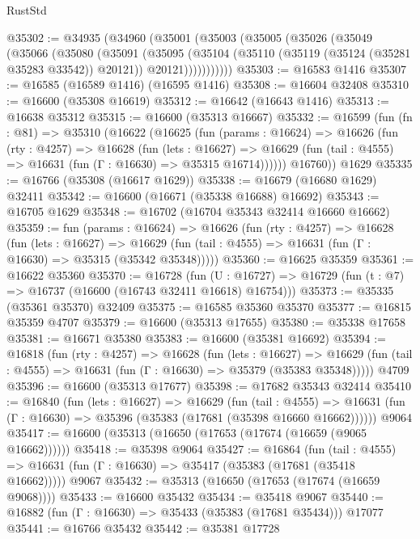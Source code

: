 \begin{lexlean}{RustStd}
\begin{coremodule}
@35302 := @34935
    (@34960
      (@35001
        (@35003
          (@35005
            (@35026
              (@35049
                (@35066
                  (@35080
                    (@35091
                      (@35095
                        (@35104
                          (@35110 (@35119 (@35124 (@35281 @35283 @33542)) @20121))
                          @20121)))))))))))
@35303 := @16583 @1416
@35307 := @16585 (@16589 @1416) (@16595 @1416)
@35308 := @16604 @32408
@35310 := @16600 (@35308 @16619)
@35312 := @16642 (@16643 @1416)
@35313 := @16638 @35312
@35315 := @16600 (@35313 @16667)
@35332 := @16599
    (fun (fn : @81) =>
    @35310
      (@16622
        (@16625
          (fun (params : @16624) =>
          @16626
            (fun (rty : @4257) =>
            @16628
              (fun (lets : @16627) =>
              @16629 (fun (tail : @4555) => @16631 (fun (Γ : @16630) => @35315 @16714))))))
        @16760))
    @1629
@35335 := @16766 (@35308 (@16617 @1629))
@35338 := @16679 (@16680 @1629) @32411
@35342 := @16600 (@16671 (@35338 @16688) @16692)
@35343 := @16705 @1629
@35348 := @16702 (@16704 @35343 @32414 @16660 @16662)
@35359 := fun (params : @16624) =>
  @16626
    (fun (rty : @4257) =>
    @16628
      (fun (lets : @16627) =>
      @16629 (fun (tail : @4555) => @16631 (fun (Γ : @16630) => @35315 (@35342 @35348)))))
@35360 := @16625 @35359
@35361 := @16622 @35360
@35370 := @16728
    (fun (U : @16727) => @16729 (fun (t : @7) => @16737 (@16600 (@16743 @32411 @16618) @16754)))
@35373 := @35335 (@35361 @35370) @32409
@35375 := @16585 @35360 @35370
@35377 := @16815 @35359 @4707
@35379 := @16600 (@35313 @17655)
@35380 := @35338 @17658
@35381 := @16671 @35380
@35383 := @16600 (@35381 @16692)
@35394 := @16818
    (fun (rty : @4257) =>
    @16628
      (fun (lets : @16627) =>
      @16629 (fun (tail : @4555) => @16631 (fun (Γ : @16630) => @35379 (@35383 @35348)))))
    @4709
@35396 := @16600 (@35313 @17677)
@35398 := @17682 @35343 @32414
@35410 := @16840
    (fun (lets : @16627) =>
    @16629
      (fun (tail : @4555) =>
      @16631 (fun (Γ : @16630) => @35396 (@35383 (@17681 (@35398 @16660 @16662))))))
    @9064
@35417 := @16600 (@35313 (@16650 (@17653 (@17674 (@16659 (@9065 @16662))))))
@35418 := @35398 @9064
@35427 := @16864
    (fun (tail : @4555) => @16631 (fun (Γ : @16630) => @35417 (@35383 (@17681 (@35418 @16662)))))
    @9067
@35432 := @35313 (@16650 (@17653 (@17674 (@16659 @9068))))
@35433 := @16600 @35432
@35434 := @35418 @9067
@35440 := @16882 (fun (Γ : @16630) => @35433 (@35383 (@17681 @35434))) @17077
@35441 := @16766 @35432
@35442 := @35381 @17728

\end{coremodule}
\end{lexlean}
